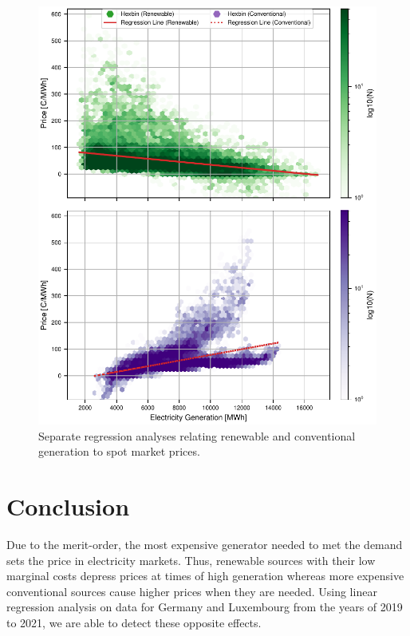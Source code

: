 \documentclass{article}
\begin{document}
\begin{figure}[h]
    \centering
    \includegraphics[width=\columnwidth]{doc/fig/ren_vs_con_regression_separate.pdf}
    \caption{Separate regression analyses relating renewable and conventional generation to spot market prices. }
    \label{fig:ren_vs_con_regression}
\end{figure}

\section{Conclusion}
Due to the merit-order, the most expensive generator needed to met the demand sets the price in electricity markets.
Thus, renewable sources with their low marginal costs depress prices at times of high generation whereas more expensive conventional sources cause higher prices when they are needed.
Using linear regression analysis on data for Germany and Luxembourg from the years of 2019 to 2021, we are able to detect these opposite effects.



\end{document}
